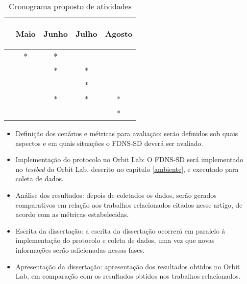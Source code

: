     \begin{table}[t]\centering
        \begin{tabular}{ | p{9cm} | c | c | c | c |}
            \hline
            \raggedleft{Atividade} & \begin{sideways}Maio\end{sideways}
             & \begin{sideways}Junho\end{sideways}
             & \begin{sideways}Julho\end{sideways}
             & \begin{sideways}Agosto\end{sideways} \\ \hline
            \raggedleft{Definição dos cenários e métricas para avaliação} & * & * &   &   \\ \hline
            \raggedleft{Implementação do protocolo no Orbit Lab} &   & * & * &   \\ \hline
            \raggedleft{Análise dos resultados} &   &   & * &   \\ \hline
            \raggedleft{Escrita da dissertação} &   & * & * & * \\ \hline
            \raggedleft{Apresentação da dissertação} &   &   &   & * \\ \hline
        \end{tabular}
        \caption{Cronograma proposto de atividades}
        \label{cronograma}
    \end{table}
    
    \begin{itemize}
        \item Definição dos cenários e métricas para avaliação: serão definidos
        sob quais aspectos e em quais situações o FDNS-SD deverá ser avaliado.
        \item Implementação do protocolo no Orbit Lab: O FDNS-SD será implementado
        no \textit{testbed} do Orbit Lab, descrito no capítulo \ref{ambiente}, e
        executado para coleta de dados.
        \item Análise dos resultados: depois de coletados os dados, serão gerados
        comparativos em relação aos trabalhos relacionados citados nesse artigo,
        de acordo com as métricas estabelecidas.
        \item Escrita da dissertação: a escrita da dissertação ocorrerá em paralelo
        à implementação do protocolo e coleta de dados, uma vez que novas informações
        serão adicionadas nessas fases.
        \item Apresentação da dissertação: apresentação dos resultados obtidos no
        Orbit Lab, em comparação com os resultados obtidos nos trabalhos relacionados.
    \end{itemize}

